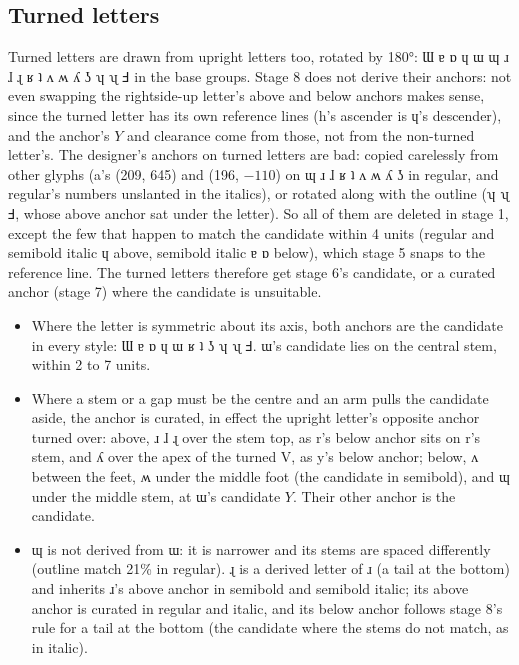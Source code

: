 \documentclass[landscape]{article}
\begin{document}
\subsection*{Turned letters}

Turned letters are drawn from upright letters too, rotated by 180°: Ɯ ɐ ɒ ɥ ɯ ɰ ɹ ɺ ɻ ʁ ʇ ʌ ʍ ʎ ʖ ʮ ʯ Ⅎ in the base groups.
Stage 8 does not derive their anchors: not even swapping the rightside-up letter's above and below anchors makes sense,
since the turned letter has its own reference lines (h's ascender is ɥ's descender), 
and the anchor's $Y$ and clearance come from those, not from the non-turned letter's.
The designer's anchors on turned letters are bad: copied carelessly from other glyphs (a's (209, 645) and (196, $-110$) on ɰ ɹ ɺ ʁ ʇ ʌ ʍ ʎ ʖ in regular, 
and regular's numbers unslanted in the italics),
or rotated along with the outline (ʮ ʯ Ⅎ, whose above anchor sat under the letter).
So all of them are deleted in stage 1, except the few that happen to match the candidate within 4 units (regular and semibold italic ɥ above, 
semibold italic ɐ ɒ below), which stage 5 snaps to the reference line.
The turned letters therefore get stage 6's candidate, or a curated anchor (stage 7) where the candidate is unsuitable.
\begin{itemize}
\item Where the letter is symmetric about its axis, both anchors are the candidate in every style: Ɯ ɐ ɒ ɥ ɯ ʁ ʇ ʖ ʮ ʯ Ⅎ. 
ɯ's candidate lies on the central stem, within 2 to 7 units.
\item Where a stem or a gap must be the centre and an arm pulls the candidate aside, 
the anchor is curated, in effect the upright letter's opposite anchor turned over:
  above, ɹ ɺ ɻ over the stem top, as r's below anchor sits on r's stem, 
  and ʎ over the apex of the turned V, as y's below anchor;
  below, ʌ between the feet, ʍ under the middle foot (the candidate in semibold), 
  and ɰ under the middle stem, at ɯ's candidate $Y$. Their other anchor is the candidate.
\item ɰ is not derived from ɯ: it is narrower and its stems are spaced differently (outline match 21\% in regular).
  ɻ is a derived letter of ɹ (a tail at the bottom) and inherits ɹ's above anchor in semibold and semibold italic; 
  its above anchor is curated in regular and italic, and its below anchor follows stage 8's rule for a tail at the bottom 
  (the candidate where the stems do not match, as in italic).
\end{itemize}
\end{document}
